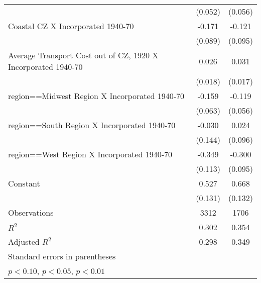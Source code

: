 \begin{table}[htbp]
\begin{tabular}{l*{2}{c}}
                    &     (0.052)         &     (0.056)         \\
[1em]
Coastal CZ X Incorporated 1940-70&      -0.171\sym{*}  &      -0.121         \\
                    &     (0.089)         &     (0.095)         \\
[1em]
Average Transport Cost out of CZ, 1920 X Incorporated 1940-70&       0.026         &       0.031\sym{*}  \\
                    &     (0.018)         &     (0.017)         \\
[1em]
region==Midwest Region X Incorporated 1940-70&      -0.159\sym{**} &      -0.119\sym{**} \\
                    &     (0.063)         &     (0.056)         \\
[1em]
region==South Region X Incorporated 1940-70&      -0.030         &       0.024         \\
                    &     (0.144)         &     (0.096)         \\
[1em]
region==West Region X Incorporated 1940-70&      -0.349\sym{***}&      -0.300\sym{***}\\
                    &     (0.113)         &     (0.095)         \\
[1em]
Constant            &       0.527\sym{***}&       0.668\sym{***}\\
                    &     (0.131)         &     (0.132)         \\
\hline
Observations        &        3312         &        1706         \\
\(R^{2}\)           &       0.302         &       0.354         \\
Adjusted \(R^{2}\)  &       0.298         &       0.349         \\
\hline\hline
\multicolumn{3}{l}{\footnotesize Standard errors in parentheses}\\
\multicolumn{3}{l}{\footnotesize \sym{*} \(p<0.10\), \sym{**} \(p<0.05\), \sym{***} \(p<0.01\)}\\
\end{tabular}
\end{table}
